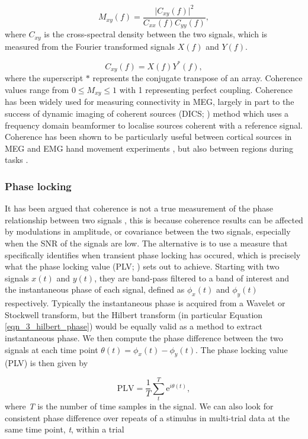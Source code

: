 \begin{equation}
M_{xy}(f) = \frac{\big|C_{xy}(f)\big|^2}{C_{xx}(f)C_{yy}(f)},
\end{equation} where $C_{xy}$ is the cross-spectral density between the two signals, which is measured from the Fourier transformed signals $X(f)$ and $Y(f)$. 

\begin{equation}
C_{xy}(f) = X(f)Y^*(f),
\end{equation} where the superscript $*$ represents the conjugate transpose of an array. Coherence values range from $0 \leq M_{xy} \leq 1$ with 1 representing perfect coupling. Coherence has been widely used for measuring connectivity in MEG, largely in part to the success of dynamic imaging of coherent sources (DICS; \citealp{Gross2001}) method which uses a frequency domain beamformer to localise sources coherent with a reference signal. Coherence has been shown to be particularly useful between cortical sources in MEG and EMG hand movement experiments \citep{Gross2001}, but also between regions during tasks \citep{Kujala2007,Bardouille2012}.

\subsubsection{Phase locking}
It has been argued that coherence is not a true measurement of the phase relationship between two signals \citep{Lachaux1999}, this is because coherence results can be affected by modulations in amplitude, or covariance between the two signals, especially when the SNR of the signals are low. The alternative is to use a measure that specifically identifies when transient phase locking has occured, which is precisely what the phase locking value (PLV; \citealp{Lachaux1999}) sets out to achieve. Starting with two signals $ x(t) $ and $ y(t) $, they are band-pass filtered to a band of interest and the instantaneous phase of each signal, defined as $ \phi_x(t) $ and $ \phi_y(t) $ respectively. Typically the instantaneous phase is acquired from a Wavelet or Stockwell transform, but the Hilbert transform (in particular Equation \ref{eqn_3_hilbert_phase}) would be equally valid as a method to extract instantaneous phase. We then compute the phase difference between the two signals at each time point $\theta(t) = \phi_x(t) - \phi_y(t)$. The phase locking value (PLV) is then given by

\begin{equation}
\text{PLV} = \frac{1}{T}\sum_{t}^{T}\text{e}^{i\theta(t)},
\end{equation} where \textit{T} is the number of time samples in the signal. We can also look for consistent phase difference over repeats of a stimulus in multi-trial data at the same time point, \textit{t}, within a trial

